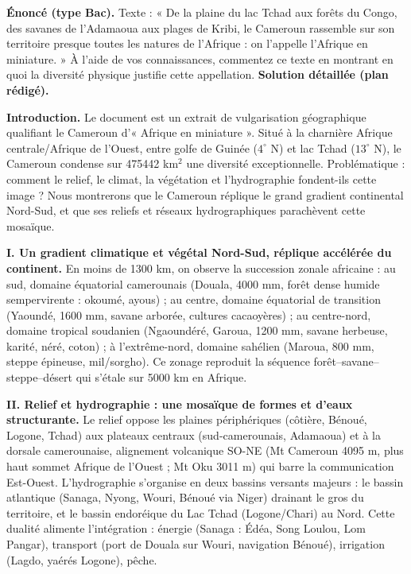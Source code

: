 \documentclass[11pt]{article}
\newcommand{\cle}[1]{{\popxbold\color{popdark}#1}}
\begin{document}
\begin{exoresolu}
\textbf{Énoncé (type Bac).} Texte : « De la plaine du lac Tchad aux forêts du Congo, des savanes de l'Adamaoua aux plages de Kribi, le Cameroun rassemble sur son territoire presque toutes les natures de l'Afrique : on l'appelle l'Afrique en miniature. » À l'aide de vos connaissances, commentez ce texte en montrant en quoi la diversité physique justifie cette appellation.
\tcblower
\textbf{Solution détaillée (plan rédigé).}

\textbf{Introduction.} Le document est un extrait de vulgarisation géographique qualifiant le Cameroun d'« Afrique en miniature ». Situé à la charnière Afrique centrale/Afrique de l'Ouest, entre golfe de Guinée ($4^{\circ}$ N) et lac Tchad ($13^{\circ}$ N), le Cameroun condense sur \num{475 442} km$^2$ une diversité exceptionnelle. Problématique : comment le relief, le climat, la végétation et l'hydrographie fondent-ils cette image ? Nous montrerons que le Cameroun réplique le grand gradient continental Nord-Sud, et que ses reliefs et réseaux hydrographiques parachèvent cette mosaïque.

\textbf{I. Un gradient climatique et végétal Nord-Sud, réplique accélérée du continent.} En moins de \num{1300} km, on observe la succession zonale africaine : au sud, domaine \cle{équatorial camerounais} (Douala, \num{4000} mm, forêt dense humide sempervirente : okoumé, ayous) ; au centre, domaine \cle{équatorial de transition} (Yaoundé, \num{1600} mm, savane arborée, cultures cacaoyères) ; au centre-nord, domaine \cle{tropical soudanien} (Ngaoundéré, Garoua, \num{1200} mm, savane herbeuse, karité, néré, coton) ; à l'extrême-nord, domaine \cle{sahélien} (Maroua, \num{800} mm, steppe épineuse, mil/sorgho). Ce zonage reproduit la séquence forêt--savane--steppe--désert qui s'étale sur \num{5000} km en Afrique.

\textbf{II. Relief et hydrographie : une mosaïque de formes et d'eaux structurante.} Le relief oppose les plaines périphériques (côtière, Bénoué, Logone, Tchad) aux plateaux centraux (sud-camerounais, Adamaoua) et à la \cle{dorsale camerounaise}, alignement volcanique SO-NE (Mt Cameroun \num{4095} m, plus haut sommet Afrique de l'Ouest ; Mt Oku \num{3011} m) qui barre la communication Est-Ouest. L'hydrographie s'organise en deux bassins versants majeurs : le \cle{bassin atlantique} (Sanaga, Nyong, Wouri, Bénoué via Niger) drainant le gros du territoire, et le \cle{bassin endoréique du Lac Tchad} (Logone/Chari) au Nord. Cette dualité alimente l'intégration : énergie (Sanaga : Édéa, Song Loulou, Lom Pangar), transport (port de Douala sur Wouri, navigation Bénoué), irrigation (Lagdo, yaérés Logone), pêche.


\end{exoresolu}
\end{document}
